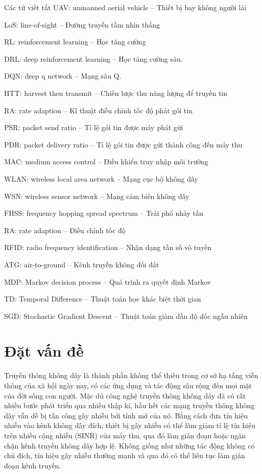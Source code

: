 \documentclass{uetgraduation}
\begin{document}
\begin{contentlisting}

\tableofcontents
\listoffigures

\begin{contentlistingsection}{Các từ viết tắt}
    UAV: unmanned aerial vehicle -- Thiết bị bay không người lái

    LoS: line-of-sight -- Đường truyền tầm nhìn thẳng

    RL: reinforcement learning -- Học tăng cường

    DRL: deep reinforcement learning -- Học tăng cường sâu.
    
    DQN: deep q network -- Mạng sâu Q.

    HTT: harvest then transmit -- Chiến lược thu năng lượng để truyền tin

    RA: rate adaption -- Kĩ thuật điều chỉnh tốc độ phát gói tin

    PSR: packet send ratio -- Tỉ lệ gói tin được máy phát gửi

    PDR: packet delivery ratio -- Tỉ lệ gói tin được gửi thành công đến máy thu

    MAC: medium access control -- Điều khiển truy nhập môi trường

    WLAN: wireless local area network -- Mạng cục bộ không dây

    WSN: wireless sensor network -- Mạng cảm biến không dây

    FHSS: frequency hopping spread spectrum -- Trải phổ nhảy tần

    RA: rate adaption -- Điều chỉnh tốc độ

    RFID: radio frequency identification -- Nhận dạng tần số vô tuyến

    ATG: air-to-ground -- Kênh truyền không đối đất

    MDP: Markov decision process -- Quá trình ra quyết định Markov

    TD: Temporal Difference -- Thuật toán học khác biệt thời gian

    SGD: Stochastic Gradient Descent -- Thuật toán giảm dần độ dốc ngẫu nhiên
\end{contentlistingsection}

\end{contentlisting}

\chapter{Đặt vấn đề}
Truyền thông không dây là thành phần không thể thiếu trong cơ sở hạ tầng viễn thông của xã hội ngày nay, có các ứng dụng và
tác động sâu rộng đến mọi mặt của đời sống con người. Mặc dù công nghệ truyền thông không dây đã có rất nhiều bước phát triển
qua nhiều thập kỉ, hầu hết các mạng truyền thông không dây vẫn dễ bị tấn công gây nhiễu bởi tính mở của nó. Bằng cách đưa tín
hiệu nhiễu vào kênh không dây đích, thiết bị gây nhiễu có thể làm giảm tỉ lệ tín hiệu trên nhiễu cộng nhiễu (SINR) của máy thu,
qua đó làm gián đoạn hoặc ngăn chặn kênh truyền không dây hợp lệ. Không giống như những tác động không có chủ đích, tín hiệu gây
nhiễu thường mạnh và qua đó có thể liên tục làm gián đoạn kênh truyền.
\end{document}
